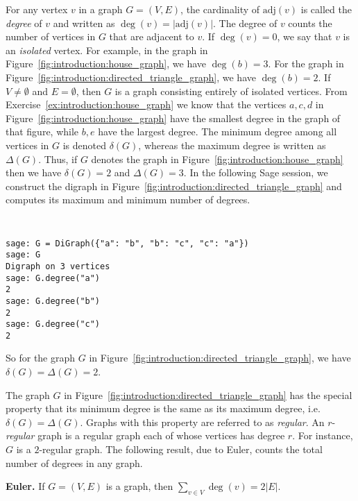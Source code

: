 For any vertex $v$ in a graph $G = (V, E)$, the cardinality of
$\text{adj}(v)$ is called the \emph{degree} of $v$ and written as
$\deg(v) = |\text{adj}(v)|$. The degree of $v$ counts the number of
vertices in $G$ that are adjacent to $v$. If $\deg(v) = 0$, we say
that $v$ is an \emph{isolated} vertex. For example, in the graph in
Figure~\ref{fig:introduction:house_graph}, we have $\deg(b) = 3$. For
the graph in Figure~\ref{fig:introduction:directed_triangle_graph}, we
have $\deg(b) = 2$. If $V \neq \emptyset$ and $E = \emptyset$, then
$G$ is a graph consisting entirely of isolated vertices. From
Exercise~\ref{ex:introduction:house_graph} we know that the vertices
$a, c, d$ in Figure~\ref{fig:introduction:house_graph} have the
smallest degree in the graph of that figure, while $b, e$ have the
largest degree. The minimum degree among all vertices in $G$ is
denoted $\delta(G)$, whereas the maximum degree is written as
$\Delta(G)$. Thus, if $G$ denotes the graph in
Figure~\ref{fig:introduction:house_graph} then we have $\delta(G) = 2$
and $\Delta(G) = 3$. In the following Sage session, we construct the
digraph in Figure~\ref{fig:introduction:directed_triangle_graph} and
computes its maximum and minimum number of degrees.

%
\begin{center}
\fontsize{10pt}{10pt}
\selectfont
\tt
\begin{lstlisting}
sage: G = DiGraph({"a": "b", "b": "c", "c": "a"})
sage: G
Digraph on 3 vertices
sage: G.degree("a")
2
sage: G.degree("b")
2
sage: G.degree("c")
2
\end{lstlisting}
\end{center}
%
So for the graph $G$ in
Figure~\ref{fig:introduction:directed_triangle_graph}, we have
$\delta(G) = \Delta(G) = 2$.

The graph $G$ in Figure~\ref{fig:introduction:directed_triangle_graph}
has the special property that its minimum degree is the same as its
maximum degree, i.e. $\delta(G) = \Delta(G)$. Graphs with this
property are referred to as \emph{regular}. An $r$-\emph{regular}
graph is a regular graph each of whose vertices has degree $r$. For
instance, $G$ is a $2$-regular graph. The following result, due to
Euler, counts the total number of degrees in any graph.

\begin{theorem}
\label{thm:introduction:degree_sum}
\label{thm:introduction:hand_shaking}
\textbf{Euler.}
If $G = (V, E)$ is a graph, then $\sum_{v \in V} \deg(v) = 2 |E|$.
\end{theorem}

